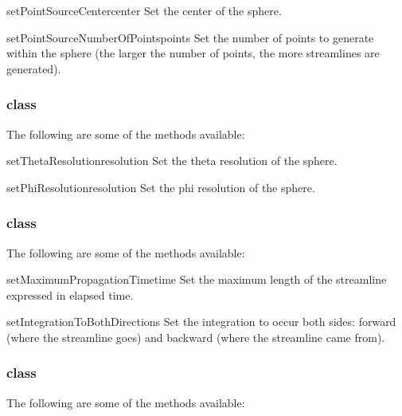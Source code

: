 \begin{methoddesc}[PointSource]{setPointSourceCenter}{center}
Set the center of the sphere.
\end{methoddesc}

\begin{methoddesc}[PointSource]{setPointSourceNumberOfPoints}{points}
Set the number of points to generate within the sphere (the larger the
number of points, the more streamlines are generated).
\end{methoddesc}

\subsubsection{\Sphere class}

The following are some of the methods available:

\begin{methoddesc}[Sphere]{setThetaResolution}{resolution}
Set the theta resolution of the sphere.
\end{methoddesc}

\begin{methoddesc}[Sphere]{setPhiResolution}{resolution}
Set the phi resolution of the sphere.
\end{methoddesc}

\subsubsection{\StreamLineModule class}

The following are some of the methods available:

\begin{methoddesc}[StreamLineModule]{setMaximumPropagationTime}{time}
Set the maximum length of the streamline expressed in elapsed time.
\end{methoddesc}

\begin{methoddesc}[StreamLineModule]{setIntegrationToBothDirections}{}
Set the integration to occur both sides: forward (where the streamline
goes) and backward (where the streamline came from).
\end{methoddesc}

\subsubsection{\Transform class}

The following are some of the methods available:

